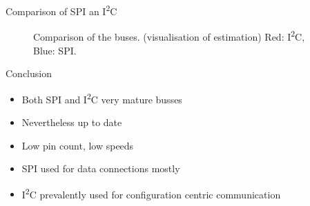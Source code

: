 \documentclass[]{beamer} %
\newcommand{\twi}{I\textsuperscript{2}C\xspace}
\begin{document}
\begin{frame}[fragile]{Comparison of SPI an \twi}
	\begin{figure}[!t]
		\centering
		\caption{Comparison of the buses. (visualisation of estimation) Red: \twi, Blue: SPI.}
	\end{figure}
\end{frame}


\begin{frame}{Conclusion}
		\begin{itemize}
			\item Both SPI and \twi very mature busses
			\item Nevertheless up to date
			\item Low pin count, low speeds
			\item SPI used for data connections mostly
			\item \twi prevalently used for configuration centric communication
		\end{itemize}
\end{frame}

\end{document}
